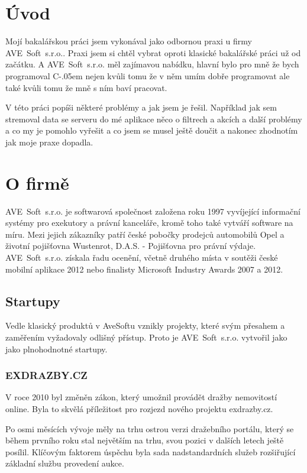 \documentclass[czech,bachelorpractice,dept460,male,csharp]{diploma}
\newcommand{\AveSoft}{AVE~Soft~s.r.o.}
\newcommand{\Csharp}{%
  {\settoheight{\dimen0}{C}C\kern-.05em \resizebox{!}{\dimen0}{\raisebox{\depth}{\#}}}}
\begin{document}
\MakeTitlePages

\section{Úvod}
Mojí bakalářskou práci jsem vykonával jako odbornou praxi u firmy \AveSoft. Praxi jsem si chtěl vybrat oproti klasické bakalářské práci už od začátku. A {\AveSoft} měl zajímavou nabídku, hlavní bylo pro mně že bych programoval {\Csharp} nejen kvůli tomu že v něm umím dobře programovat ale také kvůli tomu že mně s ním baví pracovat.

V této práci popíši některé problémy a jak jsem je řešil. Například jak sem stremoval data se serveru do mé aplikace něco o filtrech a akcích a další problémy a co my je pomohlo vyřešit a co jsem se musel ještě doučit a nakonec zhodnotím jak moje praxe dopadla.
\section{O firmě}
	\AveSoft\cite{avesoftL} je softwarová společnost založena roku 1997 vyvíjející informační systémy pro exekutory a právní kanceláře, kromě toho také vytváří software na míru.
	Mezi jejich zákazníky patří české pobočky prodejců automobilů Opel a životní pojišťovna Wustenrot, D.A.S. - Pojišťovna pro právní výdaje.
	\AveSoft\cite{avesoft} získala řadu ocenění, včetně druhého místa v soutěži české mobilní aplikace 2012 nebo finalisty Microsoft Industry Awards 2007 a 2012.
	\subsection{Startupy}
	Vedle klasický produktů v AveSoftu vznikly projekty, které svým přesahem a zaměřením vyžadovaly odlišný přístup. Proto je {\AveSoft} vytvořil jako jako plnohodnotné startupy.
 		\subsubsection{EXDRAZBY.CZ}
 		V roce 2010 byl změněn zákon, který umožnil provádět dražby nemovitostí online. Byla to skvělá příležitost pro rozjezd nového projektu exdrazby.cz.

		Po osmi měsících vývoje měly na trhu ostrou verzi dražebního portálu, který se během prvního roku stal největším na trhu, svou pozici v dalších letech ještě posílil. Klíčovým faktorem úspěchu byla sada nadstandardních služeb rozšiřující základní službu provedení aukce.
\end{document}
